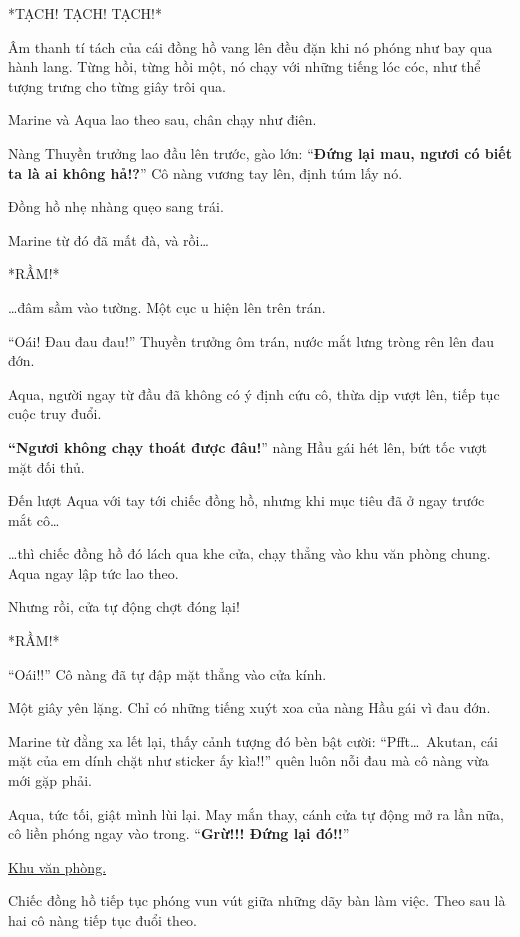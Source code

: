 \documentclass[../main.tex]{subfiles}
\begin{document}
*TẠCH! TẠCH! TẠCH!*

Âm thanh tí tách của cái đồng hồ vang lên đều đặn khi nó phóng như bay qua hành lang. Từng hồi, từng hồi một, nó chạy với những tiếng lóc cóc, như thể tượng trưng cho từng giây trôi qua.

Marine và Aqua lao theo sau, chân chạy như điên.

Nàng Thuyền trưởng lao đầu lên trước, gào lớn: ``\textbf{Đứng lại mau, ngươi có biết ta là ai không hả!?}'' Cô nàng vương tay lên, định túm lấy nó.

Đồng hồ nhẹ nhàng quẹo sang trái.

Marine từ đó đã mất đà, và rồi\dots

*RẦM!*

\dots đâm sầm vào tường. Một cục u hiện lên trên trán.

``Oái! Đau đau đau!'' Thuyền trưởng ôm trán, nước mắt lưng tròng rên lên đau đớn.

Aqua, người ngay từ đầu đã không có ý định cứu cô, thừa dịp vượt lên, tiếp tục cuộc truy đuổi.

\textbf{``Ngươi không chạy thoát được đâu!}'' nàng Hầu gái hét lên, bứt tốc vượt mặt đối thủ.

Đến lượt Aqua với tay tới chiếc đồng hồ, nhưng khi mục tiêu đã ở ngay trước mắt cô\dots

\dots thì chiếc đồng hồ đó  lách qua khe cửa, chạy thẳng vào khu văn phòng chung. Aqua ngay lập tức lao theo.

Nhưng rồi, cửa tự động chợt đóng lại!

*RẦM!*

``Oái!!'' Cô nàng đã tự đập mặt thẳng vào cửa kính.

Một giây yên lặng. Chỉ có những tiếng xuýt xoa của nàng Hầu gái vì đau đớn.

Marine từ đằng xa lết lại, thấy cảnh tượng đó bèn bật cười: ``Pfft\dots\ Akutan, cái mặt của em dính chặt như sticker ấy kìa!!'' quên luôn nỗi đau mà cô nàng vừa mới gặp phải.

Aqua, tức tối, giật mình lùi lại. May mắn thay, cánh cửa tự động mở ra lần nữa, cô liền phóng ngay vào trong. ``\textbf{Grừ!!! Đứng lại đó!!}''

\begin{center}
    \uline{Khu văn phòng.}
\end{center}

Chiếc đồng hồ tiếp tục phóng vun vút giữa những dãy bàn làm việc. Theo sau là hai cô nàng tiếp tục đuổi theo.
\end{document}
